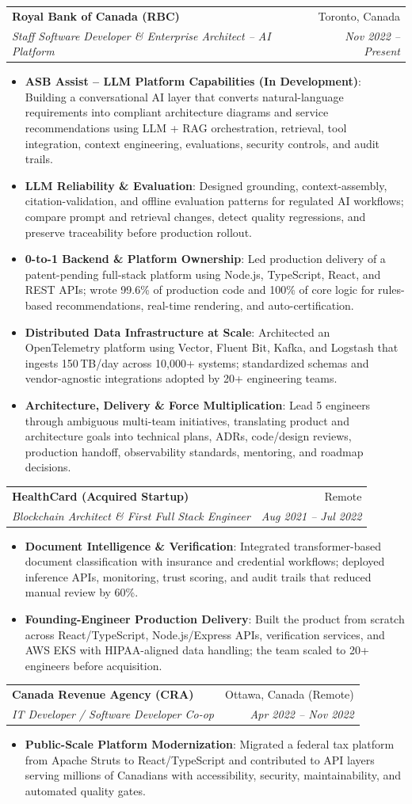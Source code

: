 \documentclass[letterpaper,9.5pt]{article}
\makeatletter
\newcommand{\resumeItem}[2]{\item\small{\textbf{#1}{: #2 \vspace{-2pt}}}}
\newcommand{\resumeSubheading}[4]{\vspace{-2pt}\item\begin{tabular*}{0.97\textwidth}{l@{\extracolsep{\fill}}r}\textbf{#1} & #2 \\\textit{\small#3} & \textit{\small #4} \\\end{tabular*}\vspace{-6pt}}
\newcommand{\resumeItemListStart}{\begin{itemize}}
\newcommand{\resumeItemListEnd}{\end{itemize}\vspace{-6pt}}
\makeatother
\begin{document}
  \resumeSubheading
    {Royal Bank of Canada (RBC)}{Toronto, Canada}
    {Staff Software Developer \& Enterprise Architect -- AI Platform}{Nov 2022 -- Present}
  \resumeItemListStart
    \resumeItem{ASB Assist -- LLM Platform Capabilities (In Development)}
      {Building a conversational AI layer that converts natural-language requirements into compliant architecture diagrams and service recommendations using LLM + RAG orchestration, retrieval, tool integration, context engineering, evaluations, security controls, and audit trails.}
    \resumeItem{LLM Reliability \& Evaluation}
      {Designed grounding, context-assembly, citation-validation, and offline evaluation patterns for regulated AI workflows; compare prompt and retrieval changes, detect quality regressions, and preserve traceability before production rollout.}
    \resumeItem{0-to-1 Backend \& Platform Ownership}
      {Led production delivery of a patent-pending full-stack platform using Node.js, TypeScript, React, and REST APIs; wrote 99.6\% of production code and 100\% of core logic for rules-based recommendations, real-time rendering, and auto-certification.}
    \resumeItem{Distributed Data Infrastructure at Scale}
      {Architected an OpenTelemetry platform using Vector, Fluent Bit, Kafka, and Logstash that ingests 150\,TB/day across 10,000+ systems; standardized schemas and vendor-agnostic integrations adopted by 20+ engineering teams.}
    \resumeItem{Architecture, Delivery \& Force Multiplication}
      {Lead 5 engineers through ambiguous multi-team initiatives, translating product and architecture goals into technical plans, ADRs, code/design reviews, production handoff, observability standards, mentoring, and roadmap decisions.}
  \resumeItemListEnd

  \resumeSubheading
    {HealthCard (Acquired Startup)}{Remote}
    {Blockchain Architect \& First Full Stack Engineer}{Aug 2021 -- Jul 2022}
  \resumeItemListStart
    \resumeItem{Document Intelligence \& Verification}
      {Integrated transformer-based document classification with insurance and credential workflows; deployed inference APIs, monitoring, trust scoring, and audit trails that reduced manual review by 60\%.}
    \resumeItem{Founding-Engineer Production Delivery}
      {Built the product from scratch across React/TypeScript, Node.js/Express APIs, verification services, and AWS EKS with HIPAA-aligned data handling; the team scaled to 20+ engineers before acquisition.}
  \resumeItemListEnd

  \resumeSubheading
    {Canada Revenue Agency (CRA)}{Ottawa, Canada (Remote)}
    {IT Developer / Software Developer Co-op}{Apr 2022 -- Nov 2022}
  \resumeItemListStart
    \resumeItem{Public-Scale Platform Modernization}
      {Migrated a federal tax platform from Apache Struts to React/TypeScript and contributed to API layers serving millions of Canadians with accessibility, security, maintainability, and automated quality gates.}
  \resumeItemListEnd
\end{document}
